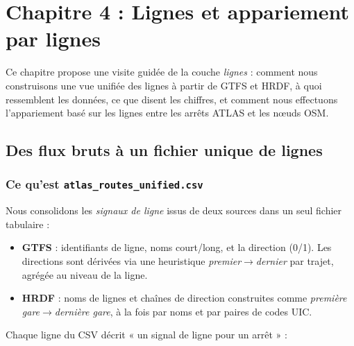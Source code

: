 \chapter{Chapitre 4 : Lignes et appariement par lignes}

\noindent Ce chapitre propose une visite guidée de la couche \emph{lignes} : comment nous construisons une vue unifiée des lignes à partir de GTFS et HRDF, à quoi ressemblent les données, ce que disent les chiffres, et comment nous effectuons l'appariement basé sur les lignes entre les arrêts ATLAS et les nœuds OSM.

\section{Des flux bruts à un fichier unique de lignes}
\subsection{Ce qu'est \texttt{atlas\_routes\_unified.csv}}
Nous consolidons les \emph{signaux de ligne} issus de deux sources dans un seul fichier tabulaire :
\begin{itemize}
  \item \textbf{GTFS} : identifiants de ligne, noms court/long, et la direction (0/1). Les directions sont dérivées via une heuristique \emph{premier$\rightarrow$dernier} par trajet, agrégée au niveau de la ligne.
  \item \textbf{HRDF} : noms de lignes et chaînes de direction construites comme \emph{première gare$\rightarrow$dernière gare}, à la fois par noms et par paires de codes UIC.
\end{itemize}
Chaque ligne du CSV décrit « un signal de ligne pour un arrêt » :


